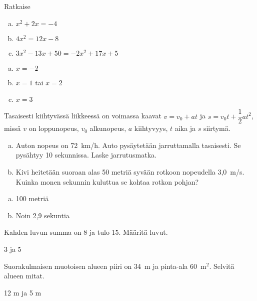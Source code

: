\begin{tehtava}
    Ratkaise
    \begin{enumerate}[a)]
        \item $x^2 + 2x = -4$
        \item $4x^2 = 12x - 8$
        \item $3x^2 - 13x + 50 = -2x^2 + 17x + 5$
    \end{enumerate}
    \begin{vastaus}
        \begin{enumerate}[a)]
            \item $x = -2$
            \item $x = 1$ tai $x = 2$
            \item $x = 3$
        \end{enumerate}
    \end{vastaus}
\end{tehtava}

\begin{tehtava}
    Tasaisesti kiihtyvässä liikkeessä on voimassa kaavat $v = v_0 + at$ ja $s = v_0t + \dfrac{1}{2}at^2$, missä $v$ on loppunopeus, $v_0$ alkunopeus, $a$ kiihtyvyys, $t$ aika ja $s$ siirtymä.
		\begin{enumerate}[a)]
            \item Auton nopeus on 72~km/h. Auto pysäytetään jarruttamalla tasaisesti. Se pysähtyy 10 sekunnissa. Laske jarrutusmatka.
            \item Kivi heitetään suoraan alas 50 metriä syvään rotkoon nopeudella 3,0~m/s. Kuinka monen sekunnin kuluttua se kohtaa rotkon pohjan?
        \end{enumerate}
    \begin{vastaus}
        \begin{enumerate}[a)]
            \item 100 metriä
            \item Noin 2,9 sekuntia
        \end{enumerate}
    \end{vastaus}
\end{tehtava}

\begin{tehtava}
    Kahden luvun summa on 8 ja tulo 15. Määritä luvut.
    \begin{vastaus}
		3 ja 5
    \end{vastaus}
\end{tehtava}

\begin{tehtava}
    Suorakulmaisen muotoisen alueen piiri on 34~m ja pinta-ala 60~m$^2$. Selvitä alueen mitat.
    \begin{vastaus}
		12 m ja 5 m
    \end{vastaus}
\end{tehtava}

